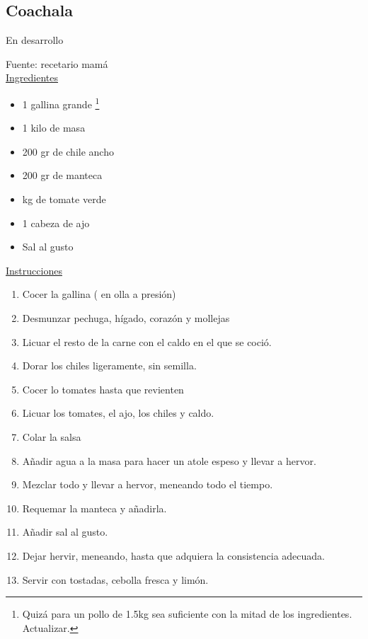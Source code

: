 \subsection{Coachala}

{\color{red} En desarrollo}

Fuente: recetario mamá\\

\underline{Ingredientes}

\begin{itemize}
\item 1 gallina grande \footnote{Quizá para un pollo de 1.5kg sea suficiente con la mitad de los ingredientes. Actualizar.}
\item 1 kilo de masa
\item 200 gr de chile ancho
\item 200 gr de manteca
\item {} kg de tomate verde
\item 1 cabeza de ajo
\item Sal al gusto
\end{itemize}

\underline{Instrucciones}

\begin{enumerate}
\item Cocer la gallina ( en olla a presión)
\item Desmunzar pechuga, hígado, corazón y mollejas
\item Licuar el resto de la carne con el caldo en el que se coció.
\item Dorar los chiles ligeramente, sin semilla.
\item Cocer lo tomates hasta que revienten
\item Licuar los tomates, el ajo, los chiles y caldo.
\item Colar la salsa
\item Añadir agua a la masa para hacer un atole espeso y llevar a hervor.
\item Mezclar todo y llevar a hervor, meneando todo el tiempo.
\item Requemar la manteca y añadirla.
\item Añadir sal al gusto.
\item Dejar hervir, meneando, hasta que adquiera la consistencia adecuada.
\item Servir con tostadas, cebolla fresca y limón.
\end{enumerate}